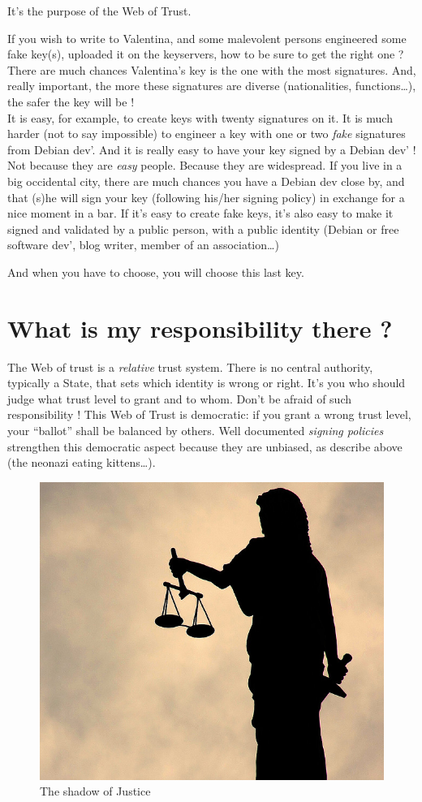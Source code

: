 It's the purpose of the Web of Trust.

If you wish to write to Valentina, and some malevolent persons engineered some fake key(s), uploaded it on the keyservers, how to be
sure to get the right one ? There are much chances Valentina's key is the one with the most signatures. And, really important, the more these signatures are
diverse (nationalities, functions\ldots{}), the safer the key will be !\\It is easy, for example, to create keys with twenty signatures on it. It is much harder (not to say impossible) to engineer a key with one or two \emph{fake} signatures from Debian dev'. And it is really easy to
have your key signed by a Debian dev' ! Not because they are \emph{easy} people. Because they are widespread. If you live in a big occidental
city, there are much chances you have a Debian dev close by, and that (s)he will sign your key (following his/her signing policy) in exchange
for a nice moment in a bar. If it's easy to create fake keys, it's also easy to make it signed and validated by a public person, with a public identity (Debian or free software dev', blog writer, member of an association\ldots{})

And when you have to choose, you will choose this last key.

\section{What is my responsibility there ?}\label{what-is-my-responsibility-there}

The Web of trust is a \emph{relative} trust system. There is no central authority, typically a State, that sets which identity is wrong or right. It's you who should judge what trust level to grant and to whom. Don't be afraid of such responsibility ! This Web of Trust is democratic: if you grant a wrong trust level, your ``ballot'' shall be balanced by others. Well documented \emph{signing policies} strengthen this democratic aspect because they are unbiased, as describe above (the neonazi eating kittens\ldots{}).

\begin{figure}[h]
\centering
\includegraphics[width=0.7\linewidth]{./images/justice.jpg}
\caption{The shadow of Justice}
\end{figure}

